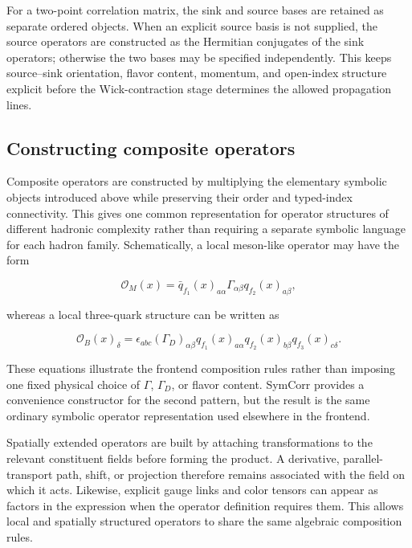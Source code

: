 \documentclass[11pt]{article}
\begin{document}
For a two-point correlation matrix, the sink and source bases are retained as
separate ordered objects. When an explicit source basis is not supplied, the
source operators are constructed as the Hermitian conjugates of the sink
operators; otherwise the two bases may be specified independently. This keeps
source--sink orientation, flavor content, momentum, and open-index structure
explicit before the Wick-contraction stage determines the allowed propagation
lines.

\subsection{Constructing composite operators}

Composite operators are constructed by multiplying the elementary symbolic
objects introduced above while preserving their order and typed-index
connectivity. This gives one common representation for operator structures of
different hadronic complexity rather than requiring a separate symbolic
language for each hadron family. Schematically, a local meson-like operator may
have the form

\begin{equation}
\mathcal O_M(x)
=
\bar q_{f_1}(x)_{a\alpha}
\Gamma_{\alpha\beta}
q_{f_2}(x)_{a\beta},
\label{eq:schematic_meson_operator}
\end{equation}

whereas a local three-quark structure can be written as

\begin{equation}
\mathcal O_B(x)_\delta
=
\epsilon_{abc}
(\Gamma_D)_{\alpha\beta}
q_{f_1}(x)_{a\alpha}
q_{f_2}(x)_{b\beta}
q_{f_3}(x)_{c\delta}.
\label{eq:schematic_baryon_operator}
\end{equation}

These equations illustrate the frontend composition rules rather than imposing
one fixed physical choice of \(\Gamma\), \(\Gamma_D\), or flavor content.
SymCorr provides a convenience constructor for the second pattern, but the
result is the same ordinary symbolic operator representation used elsewhere in
the frontend.

Spatially extended operators are built by attaching transformations to the
relevant constituent fields before forming the product. A derivative,
parallel-transport path, shift, or projection therefore remains associated with
the field on which it acts. Likewise, explicit gauge links and color tensors
can appear as factors in the expression when the operator definition requires
them. This allows local and spatially structured operators to share the same
algebraic composition rules.
\end{document}
